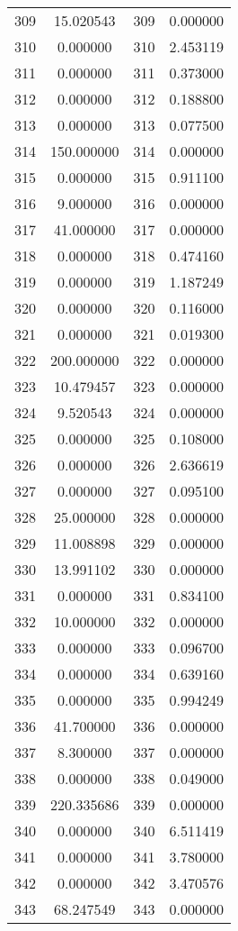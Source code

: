 \documentclass[12pt]{article}
\begin{document}
\begin{longtable}{@{}cccc@{}}
309 & 15.020543 & 309 & 0.000000 \\
310 & 0.000000 & 310 & 2.453119 \\
311 & 0.000000 & 311 & 0.373000 \\
312 & 0.000000 & 312 & 0.188800 \\
313 & 0.000000 & 313 & 0.077500 \\
314 & 150.000000 & 314 & 0.000000 \\
315 & 0.000000 & 315 & 0.911100 \\
316 & 9.000000 & 316 & 0.000000 \\
317 & 41.000000 & 317 & 0.000000 \\
318 & 0.000000 & 318 & 0.474160 \\
319 & 0.000000 & 319 & 1.187249 \\
320 & 0.000000 & 320 & 0.116000 \\
321 & 0.000000 & 321 & 0.019300 \\
322 & 200.000000 & 322 & 0.000000 \\
323 & 10.479457 & 323 & 0.000000 \\
324 & 9.520543 & 324 & 0.000000 \\
325 & 0.000000 & 325 & 0.108000 \\
326 & 0.000000 & 326 & 2.636619 \\
327 & 0.000000 & 327 & 0.095100 \\
328 & 25.000000 & 328 & 0.000000 \\
329 & 11.008898 & 329 & 0.000000 \\
330 & 13.991102 & 330 & 0.000000 \\
331 & 0.000000 & 331 & 0.834100 \\
332 & 10.000000 & 332 & 0.000000 \\
333 & 0.000000 & 333 & 0.096700 \\
334 & 0.000000 & 334 & 0.639160 \\
335 & 0.000000 & 335 & 0.994249 \\
336 & 41.700000 & 336 & 0.000000 \\
337 & 8.300000 & 337 & 0.000000 \\
338 & 0.000000 & 338 & 0.049000 \\
339 & 220.335686 & 339 & 0.000000 \\
340 & 0.000000 & 340 & 6.511419 \\
341 & 0.000000 & 341 & 3.780000 \\
342 & 0.000000 & 342 & 3.470576 \\
343 & 68.247549 & 343 & 0.000000 \\

\end{longtable}
\end{document}
